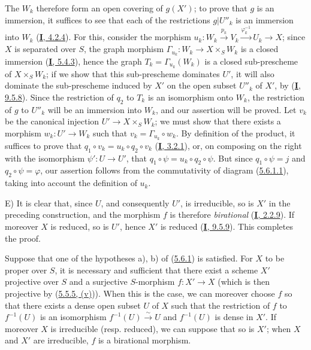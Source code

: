 The $W_k$ therefore form an open covering of $g(X')$; to prove that
$g$ is an immersion, it suffices to see that each of the restrictions
$g|U''_k$ is an immersion into $W_k$
(\hyperref[I.4.2.4]{\textbf{I}, 4.2.4}). For this, consider the morphism
$u_k:W_k\xrightarrow{p_k}V_k\xrightarrow{\varphi_k^{-1}}U_k\to X$; since
$X$ is separated over $S$, the graph morphism
$\Gamma_{u_k}:W_k\to X\times_SW_k$ is a closed immersion
(\hyperref[I.5.4.3]{\textbf{I}, 5.4.3}), hence the graph
$T_k=\Gamma_{u_k}(W_k)$ is a closed sub-prescheme of $X\times_SW_k$; if
we show that this sub-prescheme dominates $U'$, it will also dominate the
sub-prescheme induced by $X'$ on the open subset $U''_k$ of $X'$, by
(\hyperref[I.9.5.8]{\textbf{I}, 9.5.8}). Since the restriction of $q_2$ to $T_k$
is an isomorphism onto $W_k$, the restriction of $g$ to $U''_k$ will be an
immersion into $W_k$, and our assertion will be proved. Let $v_k$ be the
canonical injection $U'\to X\times_SW_k$; we must show that there exists a
morphism $w_k:U'\to W_k$ such that $v_k=\Gamma_{u_k}\circ w_k$. By
definition of the product, it suffices to prove that
$q_1\circ v_k=u_k\circ q_2\circ v_k$
(\hyperref[I.3.2.1]{\textbf{I}, 3.2.1}), or, on composing on the right
with the isomorphism $\psi':U\to U'$, that
$q_1\circ\psi=u_k\circ q_2\circ\psi$. But since $q_1\circ\psi=j$ and
$q_2\circ\psi=\varphi$, our assertion follows from the commutativity of
diagram (\hyperref[II.5.6.1.1]{5.6.1.1}), taking into account the
definition of $u_k$.

E) It is clear that, since $U$, and consequently $U'$, is irreducible, so is
$X'$ in the preceding construction, and the morphism $f$ is therefore
\emph{birational} (\hyperref[I.2.2.9]{\textbf{I}, 2.2.9}). If moreover $X$ is reduced, so
is $U'$, hence $X'$ is reduced
(\hyperref[I.9.5.9]{\textbf{I}, 9.5.9}). This completes the proof.

\begin{corollary}[5.6.2]
\label{II.5.6.2}
Suppose that one of the hypotheses \textup{a), b)} of
\textup{(\hyperref[II.5.6.1]{5.6.1})} is satisfied. For $X$ to be proper over $S$,
it is necessary and sufficient that there exist a scheme $X'$ projective over
$S$ and a surjective $S$-morphism $f:X'\to X$ (which is then projective by
\textup{(\hyperref[II.5.5.5]{5.5.5, (v)})}). When this is the case, we can
moreover choose $f$ so that there exists a dense open subset $U$ of $X$ such
that the restriction of $f$ to $f^{-1}(U)$ is an isomorphism
$f^{-1}(U)\xrightarrow{\sim}U$ and $f^{-1}(U)$ is dense in $X'$. If moreover $X$
is irreducible \textup{(resp.} reduced), we can suppose that so is $X'$; when $X$
and $X'$ are irreducible, $f$ is a birational morphism.
\end{corollary}


